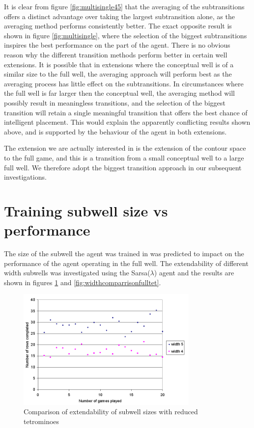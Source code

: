 \documentclass{rucsthesis}
\begin{document}
It is clear from figure \ref{fig:multisingle45} that the averaging of the subtransitions offers a distinct advantage over taking the largest subtransition alone, as the averaging method performs consistently better. The exact opposite result is shown in figure \ref{fig:multisingle}, where the selection of the biggest subtransitions inspires the best performance on the part of the agent. There is no obvious reason why the different transition methods perform better in certain well extensions. It is possible that in extensions where the conceptual well is of a similar size to the full well, the averaging approach will perform best as the averaging process has little effect on the subtransitions. In circumstances where the full well is far larger then the conceptual well, the averaging method will possibly result in meaningless transitions, and the selection of the biggest transition will retain a single meaningful transition that offers the best chance of intelligent placement. This would explain the apparently conflicting results shown above, and is supported by the behaviour of the agent in both extensions.


The extension we are actually interested in is the extension of the contour space to the full game, and this is a transition from a small conceptual well to a large full well. We therefore adopt the biggest transition approach in our subsequent investigations.

\section{Training subwell size vs performance}

The size of the subwell the agent was trained in was predicted to impact on the performance of the agent operating in the full well. The extendability of different width subwells was investigated using the Sarsa($\lambda$) agent and the results are shown in figures \ref{fig:widthcomparrison} and \ref{fig:widthcomparrisonfulltet}.

\begin{figure}[h]
\centering
\includegraphics[width=3.5in]{widthcomparrison.png}
\caption{Comparison of extendability of subwell sizes with reduced tetrominoes}
\label{fig:widthcomparrison}
\end{figure}
\end{document}
